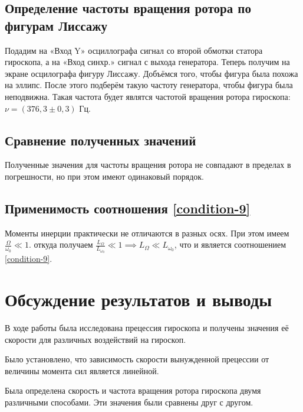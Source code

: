 \documentclass[a4paper,12pt]{article}
\begin{document}
\subsection{Определение частоты вращения ротора по фигурам Лиссажу}

Подадим на «Вход Y» осциллографа сигнал со второй обмотки статора гироскопа, а на «Вход синхр.» сигнал с выхода генератора. Теперь получим на экране осцилографа фигуру Лиссажу. Добъёмся того, чтобы фигура была похожа на эллипс. После этого подберём такую частоту генератора, чтобы фигура была неподвижна. Такая частота будет являтся частотой вращения ротора гироскопа: $\nu = (376,3 \pm 0,3 ) \text{ Гц}$.

\subsection{Сравнение полученных значений}

Полученные значения для частоты вращения ротора не совпадают в пределах в погрешности, но при этом имеют одинаковый порядок.

\subsection{Применимость соотношения \eqref{condition-9}}

Моменты инерции практически не отличаются в разных осях. При этом имеем $\frac{\Omega}{\omega_0} \ll 1$. откуда получаем $\frac{L_\Omega}{L_{\omega_0}} \ll 1 \implies L_\Omega \ll L_{\omega_0}$, что и является соотношением \eqref{condition-9}.

\section{Обсуждение результатов и выводы}

В ходе работы была исследована прецессия гироскопа и получены значения её скорости для различных воздействий на гироскоп.

Было установлено, что зависимость скорости вынужденной прецессии от величины момента сил является линейной.

Была определена скорость и частота вращения ротора гироскопа двумя различными способами. Эти значения были сравнены друг с другом.
\end{document}
